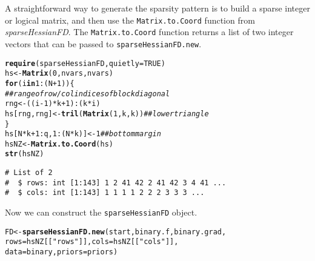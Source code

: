 \documentclass[10pt]{article}\usepackage[]{graphicx}\usepackage[]{color}
\makeatletter
\newcommand{\hlnum}[1]{\textcolor[rgb]{0.686,0.059,0.569}{#1}}%
\newcommand{\hlstr}[1]{\textcolor[rgb]{0.192,0.494,0.8}{#1}}%
\newcommand{\hlcom}[1]{\textcolor[rgb]{0.678,0.584,0.686}{\textit{#1}}}%
\newcommand{\hlopt}[1]{\textcolor[rgb]{0,0,0}{#1}}%
\newcommand{\hlstd}[1]{\textcolor[rgb]{0.345,0.345,0.345}{#1}}%
\newcommand{\hlkwa}[1]{\textcolor[rgb]{0.161,0.373,0.58}{\textbf{#1}}}%
\newcommand{\hlkwb}[1]{\textcolor[rgb]{0.69,0.353,0.396}{#1}}%
\newcommand{\hlkwc}[1]{\textcolor[rgb]{0.333,0.667,0.333}{#1}}%
\newcommand{\hlkwd}[1]{\textcolor[rgb]{0.737,0.353,0.396}{\textbf{#1}}}%
\newenvironment{kframe}{%
 \def\at@end@of@kframe{}%
 \ifinner\ifhmode%
  \def\at@end@of@kframe{\end{minipage}}%
  \begin{minipage}{\columnwidth}%
 \fi\fi%
 \def\FrameCommand##1{\hskip\@totalleftmargin \hskip-\fboxsep
 \colorbox{shadecolor}{##1}\hskip-\fboxsep
     \hskip-\linewidth \hskip-\@totalleftmargin \hskip\columnwidth}%
 \MakeFramed {\advance\hsize-\width
   \@totalleftmargin\z@ \linewidth\hsize
   \@setminipage}}%
 {\par\unskip\endMakeFramed%
 \at@end@of@kframe}
\newenvironment{knitrout}{}{} %
\renewenvironment{knitrout}{\begin{singlespace}}{\end{singlespace}}
\newcommand{\pkg}[1]{\emph{#1}}
\newcommand{\func}[1]{\texttt{#1}}
\newcommand{\class}[1]{\texttt{#1}}
\makeatother
\begin{document}
A straightforward
way to generate the sparsity pattern is to build a sparse integer or logical matrix,
and then use the \func{Matrix.to.Coord} function from
\pkg{sparseHessianFD}.  The \func{Matrix.to.Coord} function returns a
list of two integer vectors that can be passed to \func{sparseHessianFD.new}.

\begin{knitrout}
\color{fgcolor}\begin{kframe}
\begin{alltt}
\hlkwd{require}\hlstd{(sparseHessianFD,} \hlkwc{quietly}\hlstd{=}\hlnum{TRUE}\hlstd{)}
\hlstd{hs} \hlkwb{<-} \hlkwd{Matrix}\hlstd{(}\hlnum{0}\hlstd{, nvars, nvars)}
\hlkwa{for} \hlstd{(i} \hlkwa{in} \hlnum{1}\hlopt{:}\hlstd{(N} \hlopt{+} \hlnum{1}\hlstd{)) \{}
    \hlcom{## range of row / col indices of block diagonal}
    \hlstd{rng} \hlkwb{<-} \hlstd{((i}\hlopt{-}\hlnum{1}\hlstd{)}\hlopt{*}\hlstd{k}\hlopt{+}\hlnum{1}\hlstd{)}\hlopt{:}\hlstd{(k}\hlopt{*}\hlstd{i)}
    \hlstd{hs[rng, rng]} \hlkwb{<-} \hlkwd{tril}\hlstd{(}\hlkwd{Matrix}\hlstd{(}\hlnum{1}\hlstd{,k,k))} \hlcom{## lower triangle}
\hlstd{\}}
\hlstd{hs[N}\hlopt{*}\hlstd{k} \hlopt{+} \hlnum{1}\hlopt{:}\hlstd{q,} \hlnum{1}\hlopt{:}\hlstd{(N}\hlopt{*}\hlstd{k)]} \hlkwb{<-} \hlnum{1} \hlcom{## bottom margin}
\hlstd{hsNZ} \hlkwb{<-} \hlkwd{Matrix.to.Coord}\hlstd{(hs)}
\hlkwd{str}\hlstd{(hsNZ)}
\end{alltt}
\begin{verbatim}
# List of 2
#  $ rows: int [1:143] 1 2 41 42 2 41 42 3 4 41 ...
#  $ cols: int [1:143] 1 1 1 1 2 2 2 3 3 3 ...
\end{verbatim}
\end{kframe}
\end{knitrout}

Now we can construct the \class{sparseHessianFD} object.

\begin{knitrout}
\color{fgcolor}\begin{kframe}
\begin{alltt}
\hlstd{FD} \hlkwb{<-} \hlkwd{sparseHessianFD.new}\hlstd{(start, binary.f, binary.grad,}
                          \hlkwc{rows}\hlstd{=hsNZ[[}\hlstr{"rows"}\hlstd{]],} \hlkwc{cols}\hlstd{=hsNZ[[}\hlstr{"cols"}\hlstd{]],}
                          \hlkwc{data}\hlstd{=binary,} \hlkwc{priors}\hlstd{=priors)}
\end{alltt}
\end{kframe}
\end{knitrout}
\end{document}
